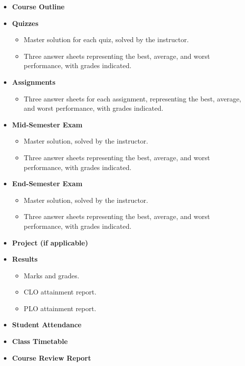 \begin{itemize}[noitemsep, topsep=0pt]
    \item \textbf{Course Outline}

    \item \textbf{Quizzes}
    \begin{itemize}
        \item Master solution for each quiz, solved by the instructor.
        \item Three answer sheets representing the best, average, and
        worst performance, with grades indicated.
    \end{itemize}

    \item \textbf{Assignments}
    \begin{itemize}
        \item Three answer sheets for each assignment, representing
        the best, average, and worst performance, with grades indicated.
    \end{itemize}

    \item \textbf{Mid-Semester Exam}
    \begin{itemize}
        \item Master solution, solved by the instructor.
        \item Three answer sheets representing the best, average, and
        worst performance, with grades indicated.
    \end{itemize}

    \item \textbf{End-Semester Exam}
    \begin{itemize}
        \item Master solution, solved by the instructor.
        \item Three answer sheets representing the best, average, and
        worst performance, with grades indicated.
    \end{itemize}

    \item \textbf{Project (if applicable)}

    \item \textbf{Results}
    \begin{itemize}
        \item Marks and grades.
        \item CLO attainment report.
        \item PLO attainment report.
    \end{itemize}

    \item \textbf{Student Attendance}

    \item \textbf{Class Timetable}

    \item \textbf{Course Review Report}
\end{itemize}


